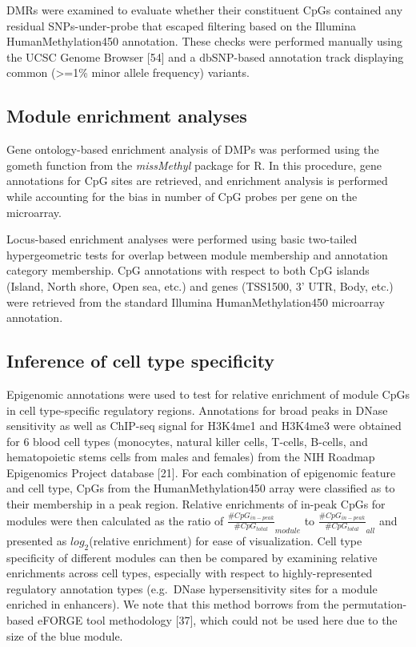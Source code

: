 \documentclass[]{article}
\theoremstyle{definition}
\theoremstyle{definition}
\theoremstyle{definition}
\theoremstyle{remark}
\begin{document}
DMRs were examined to evaluate whether their constituent CpGs contained
any residual SNPs-under-probe that escaped filtering based on the
Illumina HumanMethylation450 annotation. These checks were performed
manually using the UCSC Genome Browser {[}54{]} and a dbSNP-based
annotation track displaying common (\textgreater{}=1\% minor allele
frequency) variants.

\subsection{Module enrichment
analyses}\label{module-enrichment-analyses}

Gene ontology-based enrichment analysis of DMPs was performed using the
gometh function from the \emph{missMethyl} package for R. In this
procedure, gene annotations for CpG sites are retrieved, and enrichment
analysis is performed while accounting for the bias in number of CpG
probes per gene on the microarray.

Locus-based enrichment analyses were performed using basic two-tailed
hypergeometric tests for overlap between module membership and
annotation category membership. CpG annotations with respect to both CpG
islands (Island, North shore, Open sea, etc.) and genes (TSS1500, 3'
UTR, Body, etc.) were retrieved from the standard Illumina
HumanMethylation450 microarray annotation.

\subsection{Inference of cell type
specificity}\label{inference-of-cell-type-specificity}

Epigenomic annotations were used to test for relative enrichment of
module CpGs in cell type-specific regulatory regions. Annotations for
broad peaks in DNase sensitivity as well as ChIP-seq signal for H3K4me1
and H3K4me3 were obtained for 6 blood cell types (monocytes, natural
killer cells, T-cells, B-cells, and hematopoietic stems cells from males
and females) from the NIH Roadmap Epigenomics Project database {[}21{]}.
For each combination of epigenomic feature and cell type, CpGs from the
HumanMethylation450 array were classified as to their membership in a
peak region. Relative enrichments of in-peak CpGs for modules were then
calculated as the ratio of
\(\frac{\#CpG_{in-peak}}{\#CpG_{total}}_{module}\) to
\(\frac{\#CpG_{in-peak}}{\#CpG_{total}}_{all}\) and presented as
\(log_2\)(relative enrichment) for ease of visualization. Cell type
specificity of different modules can then be compared by examining
relative enrichments across cell types, especially with respect to
highly-represented regulatory annotation types (e.g.~DNase
hypersensitivity sites for a module enriched in enhancers). We note that
this method borrows from the permutation-based eFORGE tool methodology
{[}37{]}, which could not be used here due to the size of the blue
module.
\end{document}
